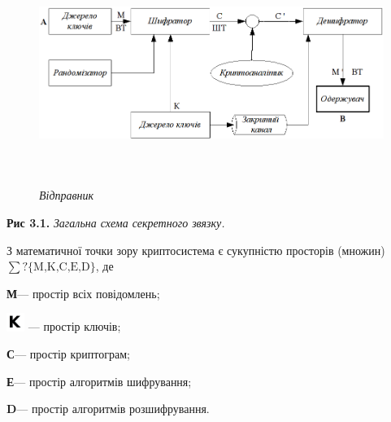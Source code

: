 \bigskip

{\centering \par}

\begin{figure}
\centering
\begin{minipage}{6.7165in}
{\centering 
\includegraphics[width=6.5909in,height=2.5602in]{crypt-img/crypt-img4.png}
\par}
\begin{minipage}{1.1161in}
{\itshape
Відправник}
\end{minipage}\end{minipage}
\end{figure}
{\centering
\textbf{Рис 3.1.} \textit{Загальна схема секретного зв{\textquotesingle}язку.}
\par}


\bigskip

З математичної точки зору криптосистема є сукупністю просторів (множин)  ${\sum
?\{\text{M,K,C,E,D}\}}$,  де 

\textbf{М}--- простір всіх повідомлень; $ $

 \includegraphics[width=0.2311in,height=0.2311in]{crypt-img/crypt-img5.png}  ---
простір ключів;

\textbf{С}--- простір криптограм;

\textbf{Е}--- простір алгоритмів шифрування;

\textbf{D}--- простір алгоритмів розшифрування.

